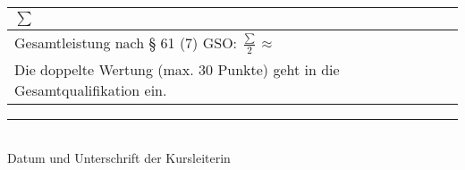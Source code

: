 \documentclass[12pt,a4paper,twoside,openright]{scrreprt}
\begin{document}
{\begin{center}
\begin{Huge}
\begin{tabular}{| l |p{2cm}|}
\hline
$\sum$ &  \\ \hline
\normalsize{Gesamtleistung nach § 61 (7) GSO: $\frac{\sum}{2}\approx$}&\\
\normalsize{Die doppelte Wertung (max. 30 Punkte) geht in die Gesamtqualifikation ein.}&\\ \hline
\end{tabular}
\end{Huge}
\end{center}

\vspace*{3truecm}

\rule{8cm}{0.4pt}\\
Datum und Unterschrift der Kursleiterin

\clearpage
}
\end{document}
